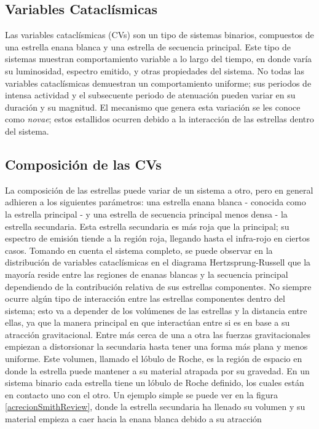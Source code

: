 \subsection*{Variables Cataclísmicas}
Las variables cataclísmicas (CVs) son un tipo de sistemas binarios, compuestos
de una estrella enana blanca y una estrella de secuencia principal. Este tipo de
sistemas muestran comportamiento variable a lo largo del tiempo, en donde varía
su luminosidad, espectro emitido, y otras propiedades del sistema. No todas las
variables cataclísmicas demuestran un comportamiento uniforme; sus periodos de
intensa actividad y el subsecuente periodo de atenuación pueden variar en su
duración y su magnitud. El mecanismo que genera esta variación se les conoce
como \textit{novae}; estos estallidos ocurren debido a la interacción de las
estrellas dentro del sistema.
\subsection*{Composición de las CVs}
La composición de las estrellas puede variar de un sistema a otro, pero en
general adhieren a los siguientes parámetros: una estrella enana blanca -
conocida como la estrella principal - y una estrella de secuencia principal
menos densa - la estrella secundaria. Esta estrella secundaria es más roja que
la principal; su espectro de emisión tiende a la región roja, llegando hasta el
infra-rojo en ciertos casos. Tomando en cuenta el sistema completo, se puede
observar en la distribución de variables cataclísmicas en el diagrama
Hertzsprung-Russell que la mayoría reside entre las regiones de enanas blancas y
la secuencia principal dependiendo de la contribución relativa de sus estrellas
componentes. \citet{disentanglingGaiaHR} No siempre ocurre algún tipo de
interacción entre las estrellas componentes dentro del sistema; esto va a
depender de los volúmenes de las estrellas y la distancia entre ellas, ya que la
manera principal en que interactúan entre si es en base a su atracción
gravitacional. Entre más cerca de una a otra las fuerzas gravitacionales
empiezan a distorsionar la secundaria hasta tener una forma más plana y menos
uniforme. Este volumen, llamado el lóbulo de Roche, es la región de espacio en
donde la estrella puede mantener a su material atrapada por su gravedad. En un
sistema binario cada estrella tiene un lóbulo de Roche definido, los cuales
están en contacto uno con el otro. Un ejemplo simple se puede ver en la figura
\ref{acrecionSmithReview}, donde la estrella secundaria ha llenado su volumen y
su material empieza a caer hacia la enana blanca debido a su atracción
